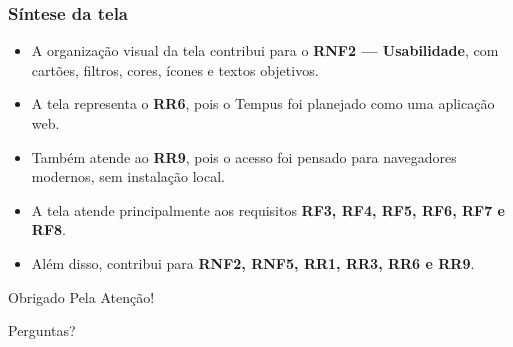 \documentclass[aspectratio=169]{beamer}
\begin{document}
\begin{frame}
\frametitle{Síntese da tela}
\small
\begin{itemize}
    \item A organização visual da tela contribui para o \textbf{RNF2 — Usabilidade}, com cartões, filtros, cores, ícones e textos objetivos.
    \item A tela representa o \textbf{RR6}, pois o Tempus foi planejado como uma aplicação web.
    \item Também atende ao \textbf{RR9}, pois o acesso foi pensado para navegadores modernos, sem instalação local.
    \item A tela atende principalmente aos requisitos \textbf{RF3, RF4, RF5, RF6, RF7 e RF8}.
    \item Além disso, contribui para \textbf{RNF2, RNF5, RR1, RR3, RR6 e RR9}.
\end{itemize}
\end{frame}

\begin{frame}
\Large{\centerline{Obrigado Pela Atenção!}}
\Large{\centerline{Perguntas?}}
\end{frame}
\end{document}
